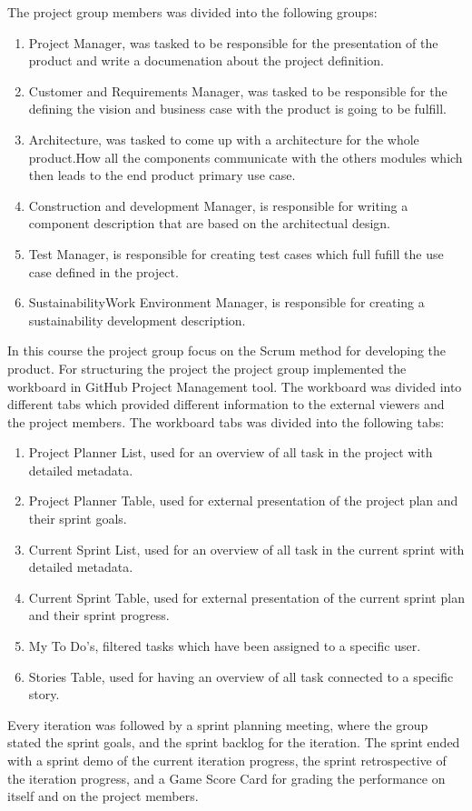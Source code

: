 The project group members was divided into the following groups:
\begin{enumerate}
    \item{Project Manager, was tasked to be responsible for the presentation of the product and write a documenation about the project definition.}
    \item{Customer and Requirements Manager, was tasked to be responsible for the defining the vision and business case with the product is going to be fulfill.}
    \item{Architecture, was tasked to come up with a architecture for the whole product.How all the components communicate with the others modules which then leads to the end product primary use case.}
    \item{Construction and development Manager, is responsible for writing a component description that are based on the architectual design.}
    \item{Test Manager, is responsible for creating test cases which full fufill the use case defined in the project.}
    \item{Sustainability\/Work Environment Manager, is responsible for creating a sustainability development description.}
\end{enumerate}


In this course the project group focus on the Scrum\cite{atlassianScrum} method for developing the product.
For structuring the project the project group implemented the workboard in GitHub Project Management tool\cite{github-project-board}.
The workboard was divided into different tabs which provided different information to the external viewers and the project members.
The workboard tabs was divided into the following tabs:
\begin{enumerate}
    \item{Project Planner List, used for an overview of all task in the project with detailed metadata.}
    \item{Project Planner Table, used for external presentation of the project plan and their sprint goals.}
    \item{Current Sprint List, used for an overview of all task in the current sprint with detailed metadata.}
    \item{Current Sprint Table, used for external presentation of the current sprint plan and their sprint progress.}
    \item{My To Do's, filtered tasks which have been assigned to a specific user.}
    \item{Stories Table, used for having an overview of all task connected to a specific story.}
\end{enumerate}

Every iteration was followed by a sprint planning meeting, where the group stated the sprint goals, and the sprint backlog for the iteration.
The sprint ended with a sprint demo of the current iteration progress, the sprint retrospective of the iteration progress, and a Game Score Card for grading the performance on itself and on the project members. 